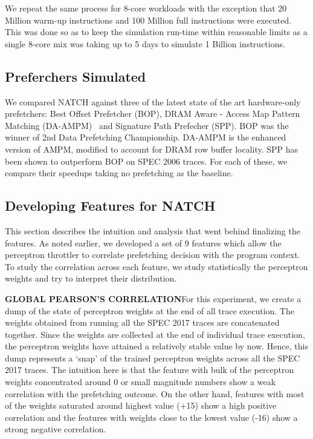 We repeat the same process for 8-core workloads with the exception
that 20 Million warm-up instructions and 100 Million full instructions
were executed.  This was done so as to keep the simulation run-time
within reasonable limits as a single 8-core mix was taking up to 5
days to simulate 1 Billion instructions.

\subsection{Preferchers Simulated}
\label{Method-Prefetchers}
We compared NATCH against three of the latest state of the art
hardware-only prefetchers: Best Offset Prefetcher (BOP), DRAM Aware - Access Map
Pattern Matching (DA-AMPM)~\cite{DA_AMPM} and Signature Path Prefecher
(SPP).  BOP was the winner of 2nd Data Prefetching Championship.
DA-AMPM is the enhanced version of AMPM, modified to account for DRAM
row buffer locality.  SPP has been shown to outperform BOP on SPEC
2006 traces.  For each of these, we compare their speedups taking no
prefetching as the baseline.


\subsection{Developing Features for NATCH}
\label{Method-Features}
This section describes the intuition and analysis that went behind
finalizing the features.  As noted earlier, we developed a set of 9
features which allow the perceptron throttler to correlate prefetching
decision with the program context.  To study the correlation across
each feature, we study statistically the perceptron weights and try to
interpret their distribution.

\textbf{GLOBAL PEARSON'S CORRELATION}\newline For this experiment, we
create a dump of the state of perceptron weights at the end of all
trace execution.  The weights obtained from running all the SPEC 2017
traces are concatenated together.  Since the weights are collected at
the end of individual trace execution, the perceptron weights have
attained a relatively stable value by now.  Hence, this dump
represents a `snap' of the trained perceptron weights across all the
SPEC 2017 traces.  The intuition here is that the feature with bulk of
the perceptron weights concentrated around 0 or small magnitude
numbers show a weak correlation with the prefetching outcome.  On the
other hand, features with most of the weights saturated around highest
value (+15) show a high positive correlation and the features with
weights close to the lowest value (-16) show a strong negative
correlation.

